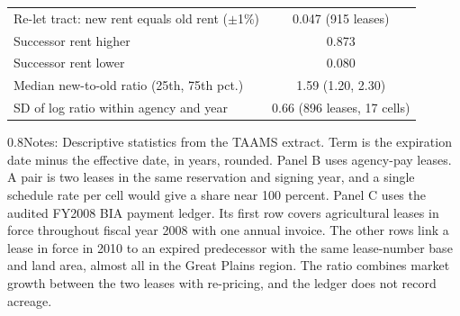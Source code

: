 \begin{table}[H]
\begin{tabular}{lcc}
Re-let tract: new rent equals old rent ($\pm$1\%) & \multicolumn{2}{c}{0.047 (915 leases)} \\
\quad Successor rent higher & \multicolumn{2}{c}{0.873} \\
\quad Successor rent lower & \multicolumn{2}{c}{0.080} \\
\quad Median new-to-old ratio (25th, 75th pct.) & \multicolumn{2}{c}{1.59 (1.20, 2.30)} \\
\quad SD of log ratio within agency and year & \multicolumn{2}{c}{0.66 (896 leases, 17 cells)} \\
\bottomrule
\end{tabular}
\parbox{1\textwidth}{\begin{spacing}{0.8}\small\noindent Notes: Descriptive statistics from the TAAMS extract. Term is the expiration date minus the effective date, in years, rounded. Panel B uses agency-pay leases. A pair is two leases in the same reservation and signing year, and a single schedule rate per cell would give a share near 100 percent. Panel C uses the audited FY2008 BIA payment ledger. Its first row covers agricultural leases in force throughout fiscal year 2008 with one annual invoice. The other rows link a lease in force in 2010 to an expired predecessor with the same lease-number base and land area, almost all in the Great Plains region. The ratio combines market growth between the two leases with re-pricing, and the ledger does not record acreage.\end{spacing}}
\end{table}

